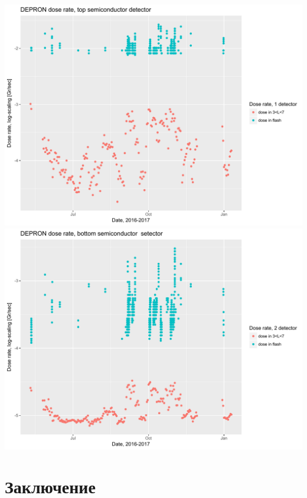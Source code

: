 \documentclass[t, aspectratio=43]{beamer}
\begin{document}
\begin{frame}	
\frametitle{\insertsection} 
\begin{center}
	\includegraphics[width=0.5\linewidth]{doseanalisys/flashdose1}
	\includegraphics[width=0.5\linewidth]{doseanalisys/flashdose2}
\end{center}


\end{frame}

\section{Заключение}

\begin{frame}	
\frametitle{\insertsection} 


\end{frame}
\end{document}
